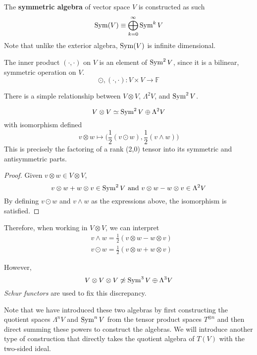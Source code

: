   \begin{definition}
  The \textbf{symmetric algebra} of vector space $V$ is constructed as such 
  \[\Sym (V) \equiv \bigoplus_{k=0}^\infty \Sym^k V\]
  Note that unlike the exterior algebra, $\Sym(V)$ is infinite dimensional. 
  \end{definition}

  \begin{example}
  The inner product $(\cdot, \cdot)$ on $V$ is an element of $\Sym^2 V$, since it is a bilinear, symmetric operation on $V$. 
  \[\odot, (\cdot, \cdot): V \times V \longrightarrow \mathbb{F}\]
  \end{example}

  There is a simple relationship between $V \otimes V$, $\Lambda^2 V$, and $\Sym^2 V$. 

  \begin{theorem}
  \[V \otimes V \simeq \Sym^2 V \oplus \Lambda^2 V\]
  with isomorphism defined
  \[v \otimes w \mapsto \Big( \frac{1}{2} (v \odot w), \frac{1}{2} (v \wedge w) \Big)\]
  This is precisely the factoring of a rank (2,0) tensor into its symmetric and antisymmetric parts. 
  \end{theorem}
  \begin{proof}
  Given $v \otimes w \in V \otimes V$, 
  \[v \otimes w + w \otimes v \in \Sym^2 V \text{ and } v \otimes w - w \otimes v \in \Lambda^2 V\]
  By defining $v \odot w$ and $v \wedge w$ as the expressions above, the isomorphism is satisfied. 
  \end{proof}

  Therefore, when working in $V \otimes V$, we can interpret 
  \begin{align*}
      & v \wedge w = \frac{1}{2} (v \otimes w - w \otimes v) \\
      & v \odot w = \frac{1}{2} (v \otimes w + w \otimes v) 
  \end{align*}

  However, 
  \[V \otimes V \otimes V \not\simeq \Sym^3 V \oplus \Lambda^3 V\]
  \textit{Schur functors} are used to fix this discrepancy. 

  Note that we have introduced these two algebras by first constructing the quotient spaces $\Lambda^n V$ and $\Sym ^n V$ from the tensor product spaces $T^{\otimes n}$ and then direct summing these powers to construct the algebras. We will introduce another type of construction that directly takes the quotient algebra of $T(V)$ with the two-sided ideal. 

